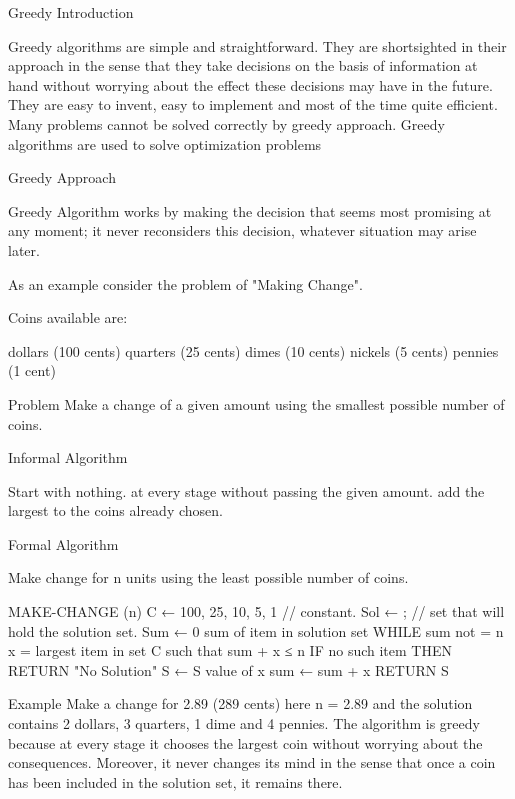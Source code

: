 
Greedy Introduction




Greedy algorithms are simple and straightforward. They are shortsighted in their approach in the sense that they take decisions on the basis of information at hand without worrying about the effect these decisions may have in the future. They are easy to invent, easy to implement and most of the time quite efficient. Many problems cannot be solved correctly by greedy approach. Greedy algorithms are used to solve optimization problems

Greedy Approach

Greedy Algorithm works by making the decision that seems most promising at any moment; it never reconsiders this decision, whatever situation may arise later.

As an example consider the problem of "Making Change".

Coins available are:

dollars (100 cents)
quarters (25 cents)
dimes (10 cents)
nickels (5 cents)
pennies (1 cent)
 

Problem    Make a change of a given amount using the smallest possible number of coins.

 

Informal Algorithm

Start with nothing.
at every stage without passing the given amount.
add the largest to the coins already chosen.
 

Formal Algorithm

Make change for n units using the least possible number of coins.

MAKE-CHANGE (n)
        C ← {100, 25, 10, 5, 1}     // constant.
        Sol ← {};                         // set that will hold the solution set.
        Sum ← 0 sum of item in solution set
        WHILE sum not = n
            x = largest item in set C such that sum + x ≤ n
            IF no such item THEN
                RETURN    "No Solution"
            S ← S {value of x}
            sum ← sum + x
        RETURN S

 

Example     Make a change for 2.89 (289 cents) here n = 2.89 and the solution contains 2 dollars, 3 quarters, 1 dime and 4 pennies. The algorithm is greedy because at every stage it chooses the largest coin without worrying about the consequences. Moreover, it never changes its mind in the sense that once a coin has been included in the solution set, it remains there.

